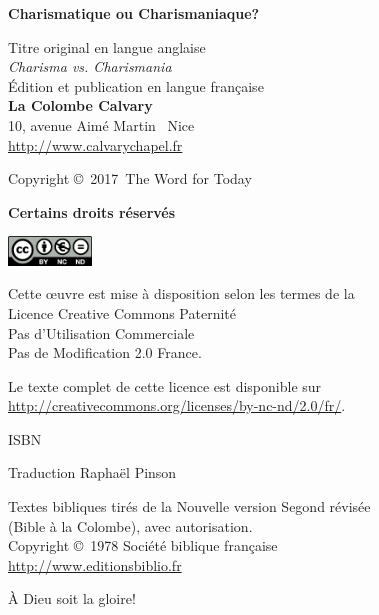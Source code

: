 \newpage
\mbox{}
\vfill

{\scriptsize

{\bfseries Charismatique ou Charismaniaque?}

Titre original en langue anglaise\frcolon{}\\
\emph{Charisma vs. Charismania} \\

Édition et publication en langue française\frcolon{}\\
 {\bfseries La Colombe Calvary}\\
 10, avenue Aimé Martin ~Nice\\
 \url{http://www.calvarychapel.fr}

Copyright \copyright{}~2017~The Word for Today

{\bfseries Certains droits réservés}

\ifluatex
  \includegraphics[width=6em]{images/by-nc-nd_eu}
\fi

Cette \oe{}uvre est mise à disposition selon les termes de la \\
 Licence Creative Commons Paternité \\
 \ocadr Pas d'Utilisation Commerciale \\
 \ocadr Pas de Modification 2.0 France.

Le texte complet de cette licence est disponible sur \\
 \url{http://creativecommons.org/licenses/by-nc-nd/2.0/fr/}.

ISBN~\isbn

Traduction\frcolon{} Raphaël Pinson

Textes bibliques tirés de la Nouvelle version Segond révisée \\
 (Bible à la Colombe), avec autorisation. \\
 Copyright \copyright{}~1978 Société biblique française \\
 \url{http://www.editionsbiblio.fr}

À Dieu soit la gloire!

}
\enlargethispage{\footskip}
\pagebreak


